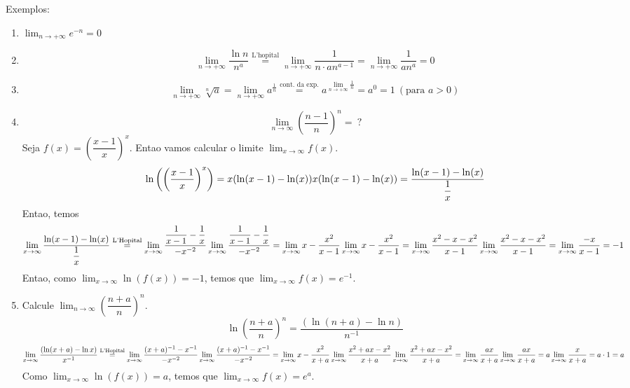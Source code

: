Exemplos:

\begin{enumerate}
\def\labelenumi{\arabic{enumi}.}
\setcounter{enumi}{6}
\item
  \(\lim_{n \to + \infty} e^{-n} = 0\)
\item
  \[
  \lim_{n \to + \infty} \dfrac{\ln n}{n^a} \overset{\text{L'hopital}}{=} \lim_{n \to + \infty} \dfrac{1}{n \cdot an^{a-1}} = \lim_{n \to + \infty} \dfrac{1}{an^a} = 0
  \]
\item
  \[
  \lim_{n \to + \infty} \sqrt[n]{a} = \lim_{n \to + \infty} a ^{\frac{1}{n}} \overset{\text{cont. da exp.}}{=} a ^ {\lim_{n \to + \infty} \frac{1}{n}} = a^0 = 1 \ (\text{para } a > 0) 
  \]
\item
  \[
  \lim_{n \to \infty} \left(\dfrac{n-1}{n}\right)^n = \ ?
  \] Seja \(f(x) = \left(\dfrac{x-1}{x}\right)^x\). Entao vamos calcular
  o limite \(\lim_{x \to \infty} f(x)\). \[
  \ln\left(\left(\dfrac{x-1}{x}\right)^x\right) = 
  x(\ln(x-1) - \ln(x))\\
  x(\ln(x-1) - \ln(x)) = 
  \dfrac{\ln(x-1) - \ln(x)}{\dfrac{1}{x}}
  \] Entao, temos \[
  \lim_{x \to \infty} \dfrac{\ln(x-1) - \ln(x)}{\dfrac{1}{x}}
  \overset{\text{L'Hopital}}{=}
  \lim_{x \to \infty}
  \dfrac{\dfrac{1}{x - 1} - \dfrac{1}{x}}{-x^{-2}}\\
  \lim_{x \to \infty}
  \dfrac{\dfrac{1}{x - 1} - \dfrac{1}{x}}{-x^{-2}} =
  \lim_{x \to \infty}
  x - \dfrac{x^2}{x-1}\\
  \lim_{x \to \infty}
  x - \dfrac{x^2}{x-1} = 
  \lim_{x \to \infty}
  \dfrac{x^2 - x - x^2}{x-1}\\
  \lim_{x \to \infty}
  \dfrac{x^2 - x - x^2}{x-1} = 
  \lim_{x \to \infty}
  \dfrac{- x}{x-1} = -1
  \] Entao, como \(\lim_{x \to \infty} \ln (f(x)) = -1\), temos que
  \(\lim_{x \to \infty} f(x) = e^{-1}\).
\item
  Calcule \(\lim_{n \to \infty} \left(\dfrac{n+a}{n}\right)^n\). \[
  \ln \left(\dfrac{n+a}{n}\right)^n = 
  \dfrac{(\ln (n + a) - \ln n)}{n^{-1}}
  \] \[
  \lim_{x \to \infty}
  \dfrac{(\ln (x + a) - \ln x)}{x^{-1}}
  \overset{\text{L'Hopital}}{=}
  \lim_{x \to \infty}
  \dfrac{(x+a)^{-1} - x^{-1}}{-x^{-2}} \\
  \lim_{x \to \infty}
  \dfrac{(x+a)^{-1} - x^{-1}}{-x^{-2}} = 
  \lim_{x \to \infty}
  x - \dfrac{x^2}{x+a}\\
  \lim_{x \to \infty}
  \dfrac{x^2 + ax - x^2}{x+a}\\
  \lim_{x \to \infty}
  \dfrac{x^2 + ax - x^2}{x+a} = 
  \lim_{x \to \infty}
  \dfrac{ax}{x+a} \\
  \lim_{x \to \infty}
  \dfrac{ax}{x+a} = 
  a \lim_{x \to \infty}
  \dfrac{x}{x+a} = a \cdot 1 = a
  \] Como \(\lim_{x \to \infty} \ln (f(x)) = a\), temos que
  \(\lim_{x \to \infty} f(x) = e^a\).
\end{enumerate}

